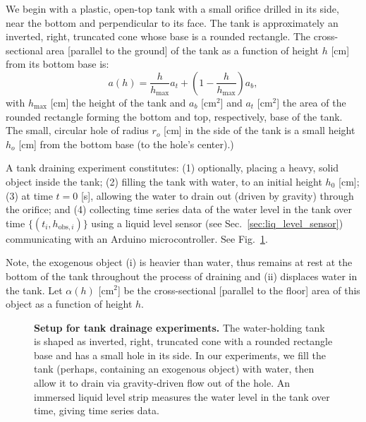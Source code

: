 \documentclass[openacc]{rsproca_new}%
\begin{document}
We begin with a plastic, open-top tank with a small orifice drilled in its side, near the bottom and perpendicular to its face.
The tank is approximately an inverted, right, truncated cone whose base is a rounded rectangle. The cross-sectional area [parallel to the ground] of the tank as a function of height $h$ [cm] from its bottom base is:
\begin{equation}
	a(h) = \frac{h}{h_{\text{max}}}a_t + \left(1-\frac{h}{h_{\text{max}}}\right) a_b, \label{eq:a_of_h}
\end{equation}
with $h_{\text{max}}$ [cm] the height of the tank and $a_b$ [cm$^2$] and $a_t$ [cm$^2$] the area of the rounded rectangle forming the bottom and top, respectively, base of the tank.
The small, circular hole of radius $r_o$ [cm] in the side of the tank is a small height $h_o$ [cm] from the bottom base (to the hole's center).)

A tank draining experiment constitutes: (1) optionally, placing a heavy, solid object inside the tank; (2) filling the tank with water, to an initial height $h_0$ [cm]; (3) at time $t=0$ [s], allowing the water to drain out (driven by gravity) through the orifice; and (4) collecting time series data of the water level in the tank over time $\{(t_i, h_{\text{obs}, i}) \}$ using a liquid level sensor (see Sec.~\ref{sec:liq_level_sensor}) communicating with an Arduino microcontroller. See Fig.~\ref{fig:photo_of_tank}.

Note, the exogenous object (i) is heavier than water, thus remains at rest at the bottom of the tank throughout the process of draining and (ii) displaces water in the tank.
Let $\alpha(h)$ [cm$^2$] be the cross-sectional [parallel to the floor] area of this object as a function of height $h$.

\begin{figure}[h!]
\begin{center}
	\caption{\textbf{Setup for tank drainage experiments.} 
	The water-holding tank is shaped as inverted, right, truncated cone with a rounded rectangle base and has a small hole in its side. In our experiments, we fill the tank (perhaps, containing an exogenous object) with water, then allow it to drain via gravity-driven flow out of the hole. An immersed liquid level strip measures the water level in the tank over time, giving time series data.
	}
	\label{fig:photo_of_tank}
\end{center}
\end{figure}
\end{document}
